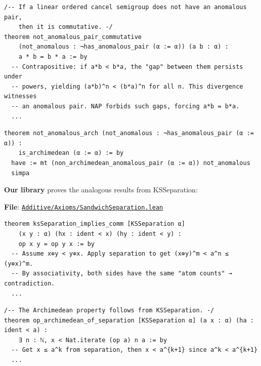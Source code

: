 \documentclass[11pt]{article}
\theoremstyle{definition}
\theoremstyle{remark}
\begin{document}
\begin{lstlisting}[caption={NAP $\Rightarrow$ Commutativity (Paul, \href{https://github.com/ericluap/OrderedSemigroups/blob/main/OrderedSemigroups/Archimedean.lean\#L357-L395}{Archimedean.lean:357--395})},numbers=none]
/-- If a linear ordered cancel semigroup does not have an anomalous pair,
    then it is commutative. -/
theorem not_anomalous_pair_commutative
    (not_anomalous : ¬has_anomalous_pair (α := α)) (a b : α) :
    a * b = b * a := by
  -- Contrapositive: if a*b < b*a, the "gap" between them persists under
  -- powers, yielding (a*b)^n < (b*a)^n for all n. This divergence witnesses
  -- an anomalous pair. NAP forbids such gaps, forcing a*b = b*a.
  ...
\end{lstlisting}

\begin{lstlisting}[caption={NAP $\Rightarrow$ Archimedean (Paul, \href{https://github.com/ericluap/OrderedSemigroups/blob/main/OrderedSemigroups/Archimedean.lean\#L397-L400}{Archimedean.lean:397--400})},numbers=none]
theorem not_anomalous_arch (not_anomalous : ¬has_anomalous_pair (α := α)) :
    is_archimedean (α := α) := by
  have := mt (non_archimedean_anomalous_pair (α := α)) not_anomalous
  simpa
\end{lstlisting}

\textbf{Our library} proves the analogous results from KSSeparation:

\textbf{File}: \href{https://github.com/zariuq/ks-foundations-of-inference/blob/main/KnuthSkilling/Additive/Axioms/SandwichSeparation.lean}{\texttt{Additive/Axioms/SandwichSeparation.lean}}

\begin{lstlisting}[caption={Separation $\Rightarrow$ Commutativity (\href{https://github.com/zariuq/ks-foundations-of-inference/blob/main/KnuthSkilling/Additive/Axioms/SandwichSeparation.lean\#L347}{SandwichSeparation.lean:404})},numbers=none]
theorem ksSeparation_implies_comm [KSSeparation α]
    (x y : α) (hx : ident < x) (hy : ident < y) :
    op x y = op y x := by
  -- Assume x⊕y < y⊕x. Apply separation to get (x⊕y)^m < a^n ≤ (y⊕x)^m.
  -- By associativity, both sides have the same "atom counts" → contradiction.
  ...
\end{lstlisting}

\begin{lstlisting}[caption={Separation $\Rightarrow$ Archimedean (\href{https://github.com/zariuq/ks-foundations-of-inference/blob/main/KnuthSkilling/Additive/Axioms/SandwichSeparation.lean\#L100-L112}{SandwichSeparation.lean:132--144})},numbers=none]
/-- The Archimedean property follows from KSSeparation. -/
theorem op_archimedean_of_separation [KSSeparation α] (a x : α) (ha : ident < a) :
    ∃ n : ℕ, x < Nat.iterate (op a) n a := by
  -- Get x ≤ a^k from separation, then x < a^{k+1} since a^k < a^{k+1}
  ...
\end{lstlisting}
\end{document}
